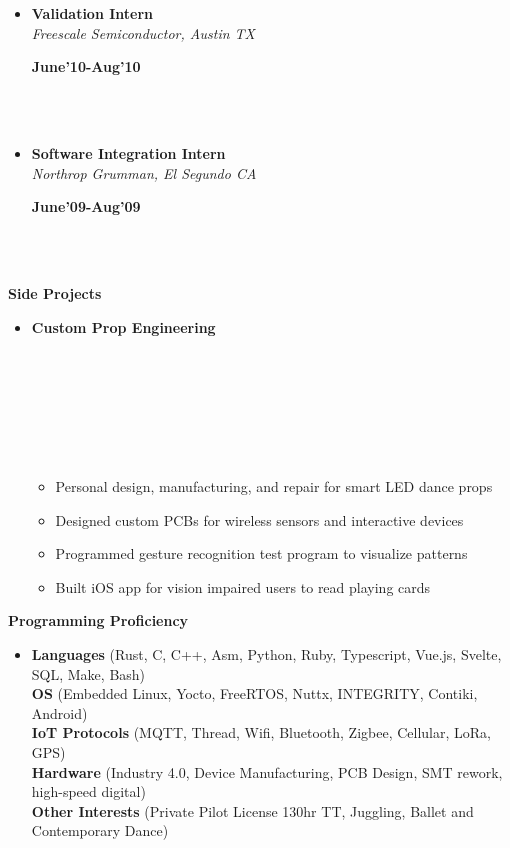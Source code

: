 \documentclass[a4paper,11pt]{article}
\newcommand{\isep}{0 pt}
\newcommand{\resheading}[1]{{\small \colorbox{mygrey}{\begin{minipage}{0.975\textwidth}{\textbf{#1 \vphantom{p\^{E}}}}\end{minipage}}}}
\newcommand{\workexp}[4]{
\begin{minipage}[t]{7cm}
\begin{flushleft}
\textbf{#1} \\
\indent \emph{#2}\\
\end{flushleft}
\end{minipage}
\hfill
\begin{minipage}[t]{7cm}
\begin{flushright}
\textbf{#3} \\
\indent #4 \\
\end{flushright}
\end{minipage}
\\[-0.10in]
}
\begin{document}
\begin{itemize}
\item
\workexp{Validation Intern}{Freescale Semiconductor, Austin TX}{June'10-Aug'10}{}

\item
\workexp{Software Integration Intern}{Northrop Grumman, El Segundo CA}{June'09-Aug'09}{}

\end{itemize}



\resheading{\textbf{Side Projects}}

\begin{itemize}
\item \workexp{Custom Prop Engineering}{}{}{}
\\[-0.3in]
	\begin{itemize} \itemsep \isep
	\item Personal design, manufacturing, and repair for smart LED dance props
	\item Designed custom PCBs for wireless sensors and interactive devices
	\item Programmed gesture recognition test program to visualize patterns
	\item Built iOS app for vision impaired users to read playing cards
	\end{itemize}
\end{itemize}



\resheading{\textbf{Programming Proficiency}}
\begin{itemize}
\item \noindent
    \textbf{Languages} (Rust, C, C++, Asm, Python, Ruby, Typescript, Vue.js, Svelte, SQL, Make, Bash)\\
    \textbf{OS} (Embedded Linux, Yocto, FreeRTOS, Nuttx, INTEGRITY, Contiki, Android)\\
    \textbf{IoT Protocols} (MQTT, Thread, Wifi, Bluetooth, Zigbee, Cellular, LoRa, GPS) \\
    \textbf{Hardware} (Industry 4.0, Device Manufacturing, PCB Design, SMT rework, high-speed digital)\\
    \textbf{Other Interests} (Private Pilot License 130hr TT, Juggling, Ballet and Contemporary Dance)
\end{itemize} 
\end{document}
